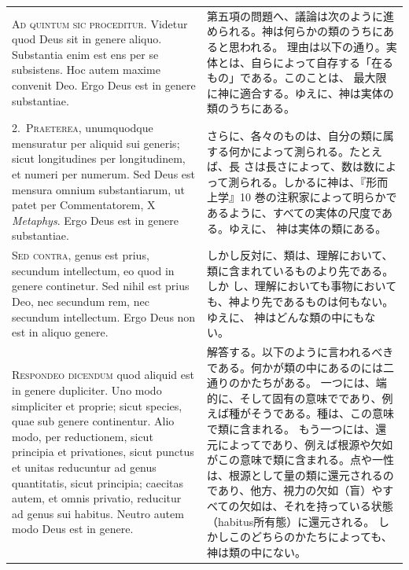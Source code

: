 \documentclass[paper=a4paper,fontsize=10pt,jafontsize=9pt,titlepage]{jlreq}
\begin{document}
\begin{longtable}{p{21em}p{21em}}
{\huge A}{\scshape d quintum sic proceditur}. Videtur quod Deus sit in genere
 aliquo. Substantia enim est ens per se subsistens. Hoc autem maxime
 convenit Deo. Ergo Deus est in genere substantiae.

&

第五項の問題へ、議論は次のように進められる。神は何らかの類のうちにあると思われる。
理由は以下の通り。実体とは、自らによって自存する「在るもの」である。このことは、
 最大限に神に適合する。ゆえに、神は実体の類のうちにある。

\\

2.~{\scshape Praeterea}, unumquodque mensuratur per aliquid sui generis; sicut
 longitudines per longitudinem, et numeri per numerum. Sed Deus est
 mensura omnium substantiarum, ut patet per Commentatorem, X
 {\itshape Metaphys}. Ergo Deus est in genere substantiae.

&
さらに、各々のものは、自分の類に属する何かによって測られる。たとえば、長
 さは長さによって、数は数によって測られる。しかるに神は、『形而上学』10
 巻の注釈家によって明らかであるように、すべての実体の尺度である。ゆえに、
 神は実体の類にある。

\\

{\scshape Sed contra}, genus est prius, secundum intellectum, eo quod in genere
 continetur. Sed nihil est prius Deo, nec secundum rem, nec secundum
 intellectum. Ergo Deus non est in aliquo genere.

&
しかし反対に、類は、理解において、類に含まれているものより先である。しか
 し、理解においても事物においても、神より先であるものは何もない。ゆえに、
 神はどんな類の中にもない。

\\
{\scshape Respondeo dicendum} quod aliquid est in genere dupliciter.
Uno modo simpliciter et proprie; sicut species, quae sub genere continentur.
Alio modo, per reductionem, sicut principia et privationes, sicut
 punctus et unitas reducuntur ad genus quantitatis, sicut principia;
 caecitas autem, et omnis privatio, reducitur ad genus sui habitus.
Neutro autem modo Deus est in genere.

&
解答する。以下のように言われるべきである。何かが類の中にあるのには二通りのかたちがある。
一つには、端的に、そして固有の意味でであり、例えば種がそうである。種は、この意味で類に含まれる。
もう一つには、還元によってであり、例えば根源や欠如がこの意味で類に含まれる。点や一性は、根源として量の類に還元されるのであり、他方、視力の欠如（盲）やすべての欠如は、それを持っている状態（habitus所有態）に還元される。
しかしこのどちらのかたちによっても、神は類の中にない。


\end{longtable}
\end{document}
